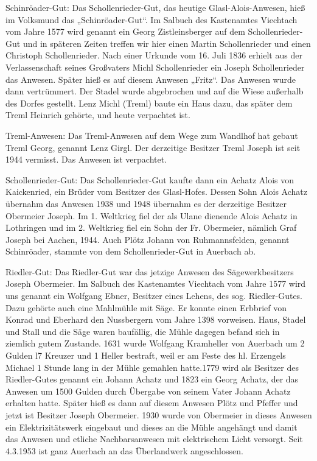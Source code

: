 \documentclass[12pt,a4pager]{book}
\begin{document}
Schinröader-Gut: Das Schollenrieder-Gut, das heutige Glasl-Alois-Anwesen, hieß
im Volksmund das „Schinröader-Gut“. Im Salbuch des Kastenamtes Viechtach vom
Jahre 1577 wird genannt ein Georg Zistleinsberger auf dem Schollenrieder-Gut und
in späteren Zeiten treffen wir hier einen Martin Schollenrieder und einen
Christoph Schollenrieder. Nach einer Urkunde vom 16. Juli 1836 erhielt aus der
Verlassenschaft seines Großvaters Michl Schollenrieder ein Joseph Schollenrieder
das Anwesen. Später hieß es auf diesem Anwesen „Fritz“. Das Anwesen wurde dann
vertrümmert. Der Stadel wurde abgebrochen und auf die Wiese außerhalb des Dorfes
gestellt. Lenz Michl (Treml) baute ein Haus dazu, das später dem Treml Heinrich
gehörte, und heute verpachtet ist.

Treml-Anwesen: Das Treml-Anwesen auf dem Wege zum Wandlhof hat gebaut Treml
Georg, genannt Lenz Girgl. Der derzeitige Besitzer Treml Joseph ist seit 1944
vermisst. Das Anwesen ist verpachtet.

Schollenrieder-Gut: Das Schollenrieder-Gut kaufte dann ein Achatz Alois von
Kaickenried, ein Brüder vom Besitzer des Glasl-Hofes. Dessen Sohn Alois Achatz
übernahm das Anwesen 1938 und 1948 übernahm es der derzeitige Besitzer Obermeier
Joseph. Im 1. Weltkrieg fiel der als Ulane dienende Alois Achatz in Lothringen
und im 2. Weltkrieg fiel ein Sohn der Fr. Obermeier, nämlich Graf Joseph bei
Aachen, 1944. Auch Plötz Johann von Ruhmannsfelden, genannt Schinröader, stammte
von dem Schollenrieder-Gut in Auerbach ab.

Riedler-Gut: Das Riedler-Gut war das jetzige Anwesen des Sägewerkbesitzers
Joseph Obermeier. Im Salbuch des Kastenamtes Viechtach vom Jahre 1577 wird uns
genannt ein Wolfgang Ebner, Besitzer eines Lehens, des sog. Riedler-Gutes. Dazu
gehörte auch eine Mahlmühle mit Säge. Er konnte einen Erbbrief von Konrad und
Eberhard den Nussbergern vom Jahre 1398 vorweisen. Haus, Stadel und Stall und
die Säge waren baufällig, die Mühle dagegen befand sich in ziemlich gutem
Zustande. 1631 wurde Wolfgang Kramheller von Auerbach um 2 Gulden l7 Kreuzer und
1 Heller bestraft, weil er am Feste des hl. Erzengels Michael 1 Stunde lang in
der Mühle gemahlen hatte.1779 wird als Besitzer des Riedler-Gutes genannt ein
Johann Achatz und 1823 ein Georg Achatz, der das Anwesen um 1500 Gulden durch
Übergabe von seinem Vater Johann Achatz erhalten hatte. Später hieß es dann auf
diesem Anwesen Plötz und Pfeffer und jetzt ist Besitzer Joseph Obermeier. 1930
wurde von Obermeier in dieses Anwesen ein Elektrizitätswerk eingebaut und dieses
an die Mühle angehängt und damit das Anwesen und etliche Nachbarsanwesen mit
elektrischem Licht versorgt. Seit 4.3.1953 ist ganz Auerbach an das Überlandwerk
angeschlossen.
\end{document}
